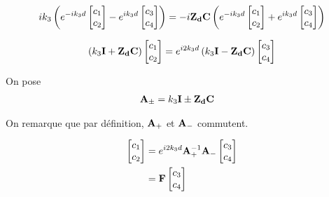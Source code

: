 \begin{equation}
    ik_3\left( e^{-ik_3 d}
    \begin{bmatrix}
        c_1 \\
        c_2
    \end{bmatrix}
    -e^{ik_3 d}
    \begin{bmatrix}
        c_3 \\
        c_4
    \end{bmatrix}
    \right)
    =-i\mathbf{Z_d}\mathbf{C}
    \left(
        e^{-ik_3 d}
        \begin{bmatrix}
            c_1 \\
            c_2
        \end{bmatrix}
        +e^{ik_3 d}
        \begin{bmatrix}
            c_3 \\
            c_4
        \end{bmatrix}
    \right)
\end{equation}

\begin{equation}
    \left(k_3\mathbf{I} + \mathbf{Z_d}\mathbf{C}\right)
    \begin{bmatrix}
        c_1 \\
        c_2
    \end{bmatrix}
    = e^{i2k_3 d} \left(k_3\mathbf{I} - \mathbf{Z_d}\mathbf{C}\right)
    \begin{bmatrix}
        c_3 \\
        c_4
    \end{bmatrix}
\end{equation}

On pose
\begin{align}
    \mathbf{A}_\pm &= k_3\mathbf{I} \pm \mathbf{Z_d}\mathbf{C}
\end{align}

On remarque que par définition, $\mathbf{A}_+$ et $\mathbf{A}_-$ commutent.


\begin{align}
    \begin{bmatrix}
        c_1 \\
        c_2
    \end{bmatrix}
    &= e^{i2 k_3 d} \mathbf{A}_+^{-1}\mathbf{A}_-
    \begin{bmatrix}
        c_3 \\
        c_4
    \end{bmatrix}
    \\
    & = \mathbf{F}
    \begin{bmatrix}
        c_3 \\
        c_4
    \end{bmatrix}
\end{align}

